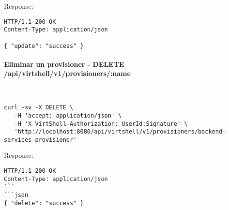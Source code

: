 Response:

\begin{lstlisting}[style=json]
HTTP/1.1 200 OK
Content-Type: application/json

{ "update": "success" }
\end{lstlisting}

\paragraph{Eliminar un provisioner - DELETE \\ /api/virtshell/v1/provisioners/:name} ~\\

\begin{lstlisting}[style=json]
curl -sv -X DELETE \
   -H 'accept: application/json' \
   -H 'X-VirtShell-Authorization: UserId:Signature' \
   'http://localhost:8080/api/virtshell/v1/provisioners/backend-services-provisioner'
\end{lstlisting}

Response:

\begin{lstlisting}[style=json]
HTTP/1.1 200 OK
Content-Type: application/json
```
```json
{ "delete": "success" }
\end{lstlisting}